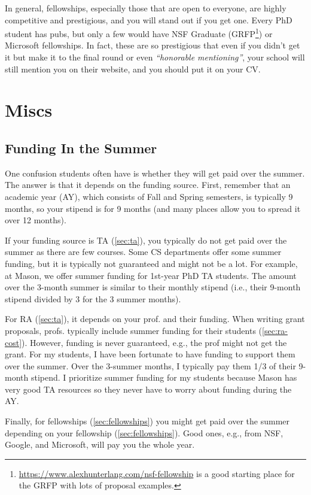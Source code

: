 \documentclass[oneside,11pt,dvipsnames]{book}
\begin{document}
In general, fellowships, especially those that are open to everyone, are highly competitive and prestigious, and you will stand out if you get one.  Every PhD student has pubs, but only a few would have NSF Graduate (GRFP\footnote{\url{https://www.alexhunterlang.com/nsf-fellowship} is a good starting place for the GRFP with lots of proposal examples.}) or Microsoft fellowships. In fact, these are so prestigious that even if you didn't get it but make it to the final round or even \emph{``honorable mentioning''}, your school will still mention you on their website, and you should put it on your CV.

\section{Miscs}

\subsection{Funding In the Summer}\label{sec:summer-funding}

One confusion students often have is whether they will get paid over the summer.  The answer is that it depends on the funding source.
First, remember that an academic year (AY), which consists of Fall and Spring semesters, is typically 9 months, so your stipend is for 9 months (and many places allow you to spread it over 12 months).

If your funding source is TA (\autoref{sec:ta}), you typically do not get paid over the summer as there are few courses.
Some CS departments offer some summer funding, but it is typically not guaranteed and might not be a lot. For example, at Mason, we offer summer funding for 1st-year PhD TA students. The amount over the 3-month summer is similar to their monthly stipend (i.e., their 9-month stipend divided by 3 for the 3 summer months).

For RA (\autoref{sec:ta}), it depends on your prof. and their funding. When writing grant proposals, profs. typically include summer funding for their students (\autoref{sec:ra-cost}). However, funding is never guaranteed, e.g., the prof might not get the grant.
For my students, I have been fortunate to have funding to support them over the summer. Over the 3-summer months, I typically pay them 1/3 of their 9-month stipend. I prioritize summer funding for my students because Mason has very good TA resources so they never have to worry about funding during the AY.

Finally, for fellowships (\autoref{sec:fellowships}) you might get paid over the summer depending on your fellowship (\autoref{sec:fellowships}). Good ones, e.g., from NSF, Google, and Microsoft, will pay you the whole year.
\end{document}
